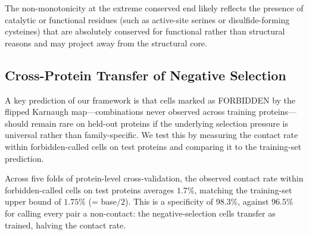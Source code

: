 The non-monotonicity at the extreme conserved end likely reflects the presence
of catalytic or functional residues (such as active-site serines or
disulfide-forming cysteines) that are absolutely conserved for functional
rather than structural reasons and may project away from the structural core.

\subsection{Cross-Protein Transfer of Negative Selection}
A key prediction of our framework is that cells marked as FORBIDDEN by the
flipped Karnaugh map---combinations never observed across training
proteins---should remain rare on held-out proteins if the underlying
selection pressure is universal rather than family-specific.  We test this by
measuring the contact rate within forbidden-called cells on test proteins and
comparing it to the training-set prediction.

Across five folds of protein-level cross-validation, the observed contact rate
within forbidden-called cells on test proteins averages $1.7\%$, matching the
training-set upper bound of $1.75\%$ (= base$/2$).  This is a specificity
of $98.3\%$, against $96.5\%$ for calling every pair a non-contact: the
negative-selection cells transfer as trained, halving the contact rate.
